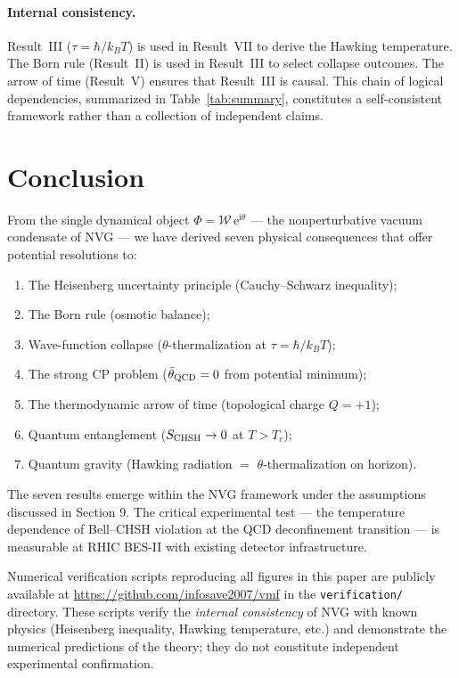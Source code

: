 \documentclass[12pt,a4paper]{article}
\theoremstyle{plain}
\theoremstyle{definition}
\theoremstyle{remark}
\newcommand{\hb}{\hbar}
\newcommand{\kB}{k_{\!B}}
\newcommand{\Wc}{\mathcal{W}}
\newcommand{\ee}{\mathrm{e}}
\newcommand{\ii}{\mathrm{i}}
\begin{document}
\paragraph{Internal consistency.}
Result~III ($\tau = \hb/\kB T$) is used in Result~VII to
derive the Hawking temperature.  The Born rule (Result~II) is
used in Result~III to select collapse outcomes.  The arrow of
time (Result~V) ensures that Result~III is causal.
This chain of logical dependencies, summarized in
Table~\ref{tab:summary}, constitutes a self-consistent framework
rather than a collection of independent claims.


\section{Conclusion}\label{sec:conclusion}

From the single dynamical object
$\Phi = \Wc\,\ee^{\ii\theta}$ — the nonperturbative vacuum
condensate of NVG — we have derived seven physical consequences
that offer potential resolutions to:

\begin{enumerate}
  \item The Heisenberg uncertainty principle
    (Cauchy--Schwarz inequality);
  \item The Born rule (osmotic balance);
  \item Wave-function collapse
    ($\theta$-thermalization at $\tau = \hb/\kB T$);
  \item The strong CP problem
    ($\bar\theta_{\rm QCD} = 0$ from potential minimum);
  \item The thermodynamic arrow of time
    (topological charge $Q = +1$);
  \item Quantum entanglement
    ($S_{\rm CHSH} \to 0$ at $T > T_c$);
  \item Quantum gravity
    (Hawking radiation $=$ $\theta$-thermalization on horizon).
\end{enumerate}

The seven results emerge within the NVG framework under the assumptions discussed in Section 9.  The critical experimental test — the temperature
dependence of Bell--CHSH violation at the QCD deconfinement
transition — is measurable at RHIC BES-II with existing
detector infrastructure.

Numerical verification scripts reproducing all figures in this
paper are publicly available at
\url{https://github.com/infosave2007/vmf} in the
\texttt{verification/} directory.
These scripts verify the \emph{internal consistency} of NVG
with known physics (Heisenberg inequality, Hawking temperature,
etc.) and demonstrate the numerical predictions of the
theory; they do not constitute independent experimental
confirmation.
\end{document}
